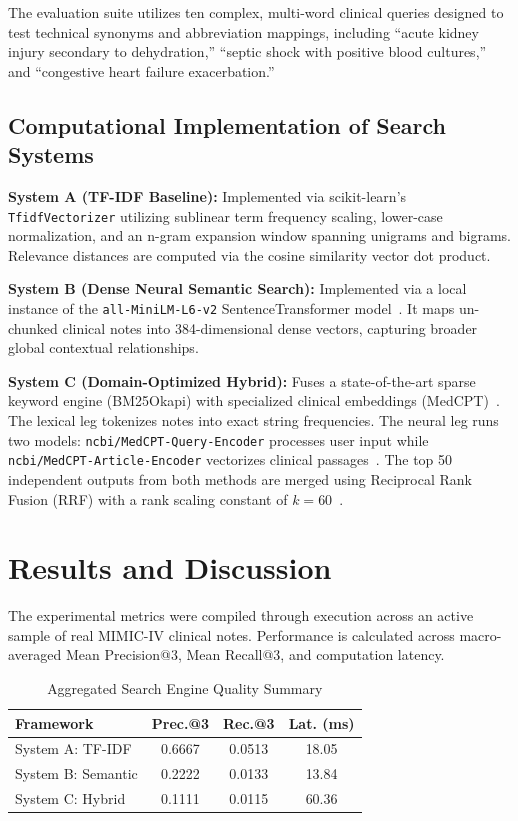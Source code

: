 \documentclass[conference]{IEEEtran}
\begin{document}
The evaluation suite utilizes ten complex, multi-word clinical queries designed to test technical synonyms and abbreviation mappings, including ``acute kidney injury secondary to dehydration,'' ``septic shock with positive blood cultures,'' and ``congestive heart failure exacerbation.''

\subsection{Computational Implementation of Search Systems}
\textbf{System A (TF-IDF Baseline):} Implemented via scikit-learn's \texttt{TfidfVectorizer} utilizing sublinear term frequency scaling, lower-case normalization, and an n-gram expansion window spanning unigrams and bigrams. Relevance distances are computed via the cosine similarity vector dot product.

\textbf{System B (Dense Neural Semantic Search):} Implemented via a local instance of the \texttt{all-MiniLM-L6-v2} SentenceTransformer model~\cite{reimers2019sentence}. It maps un-chunked clinical notes into 384-dimensional dense vectors, capturing broader global contextual relationships.

\textbf{System C (Domain-Optimized Hybrid):} Fuses a state-of-the-art sparse keyword engine (BM25Okapi) with specialized clinical embeddings (MedCPT)~\cite{robertson2009probabilistic,jin2023medcpt}. The lexical leg tokenizes notes into exact string frequencies. The neural leg runs two models: \texttt{ncbi/MedCPT-Query-Encoder} processes user input while \texttt{ncbi/MedCPT-Article-Encoder} vectorizes clinical passages~\cite{jin2023medcpt}. The top 50 independent outputs from both methods are merged using Reciprocal Rank Fusion (RRF) with a rank scaling constant of $k=60$~\cite{cormack2009reciprocal}.

\section{Results and Discussion}
The experimental metrics were compiled through execution across an active sample of real MIMIC-IV clinical notes. Performance is calculated across macro-averaged Mean Precision@3, Mean Recall@3, and computation latency.

\begin{table}[!t]
\caption{Aggregated Search Engine Quality Summary}
\label{tab:aggregated}
\centering
\begin{tabular}{lccc}
\hline
\textbf{Framework} & \textbf{Prec.@3} & \textbf{Rec.@3} & \textbf{Lat. (ms)} \\
\hline
System A: TF-IDF & 0.6667 & 0.0513 & 18.05 \\
System B: Semantic & 0.2222 & 0.0133 & 13.84 \\
System C: Hybrid & 0.1111 & 0.0115 & 60.36 \\
\hline
\end{tabular}
\end{table}
\end{document}

